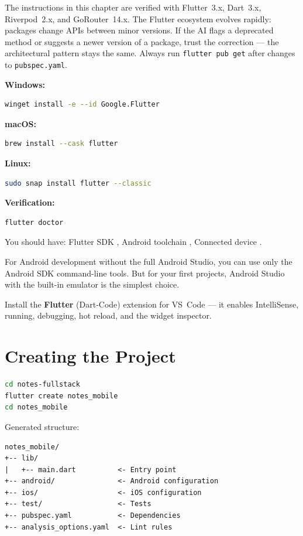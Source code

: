 \begin{versionbox}
The instructions in this chapter are verified with Flutter~3.x, Dart~3.x, Riverpod~2.x, and GoRouter~14.x. The Flutter ecosystem evolves rapidly: packages change APIs between minor versions. If the AI flags a deprecated method or suggests a newer version of a package, trust the correction --- the architectural pattern stays the same. Always run \texttt{flutter pub get} after changes to \texttt{pubspec.yaml}.
\end{versionbox}

\begin{praticabox}[title={Hands-on --- Installation}]
\textbf{Windows:}
\begin{lstlisting}[language=bash]
winget install -e --id Google.Flutter
\end{lstlisting}

\textbf{macOS:}
\begin{lstlisting}[language=bash]
brew install --cask flutter
\end{lstlisting}

\textbf{Linux:}
\begin{lstlisting}[language=bash]
sudo snap install flutter --classic
\end{lstlisting}

\textbf{Verification:}
\begin{lstlisting}[language=bash]
flutter doctor
\end{lstlisting}
You should have: Flutter SDK \checkmark, Android toolchain \checkmark, Connected device \checkmark.
\end{praticabox}

\begin{tipbox}
For Android development without the full Android Studio, you can use only the Android SDK command-line tools. But for your first projects, Android Studio with the built-in emulator is the simplest choice.
\end{tipbox}

Install the \textbf{Flutter} (Dart-Code) extension for VS~Code --- it enables IntelliSense, running, debugging, hot reload, and the widget inspector.

\section{Creating the Project}

\begin{praticabox}[title={Hands-on --- Project scaffold}]
\begin{lstlisting}[language=bash]
cd notes-fullstack
flutter create notes_mobile
cd notes_mobile
\end{lstlisting}
Generated structure:
\begin{lstlisting}[language={}]
notes_mobile/
+-- lib/
|   +-- main.dart          <- Entry point
+-- android/               <- Android configuration
+-- ios/                   <- iOS configuration
+-- test/                  <- Tests
+-- pubspec.yaml           <- Dependencies
+-- analysis_options.yaml  <- Lint rules
\end{lstlisting}
\end{praticabox}


